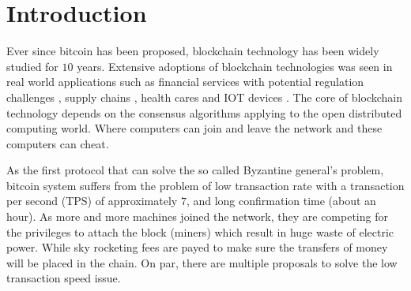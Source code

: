 \section{Introduction}
Ever since bitcoin \cite{nakamoto2008bitcoin} has been proposed, blockchain technology has been widely studied for $10$ years. 
Extensive adoptions of blockchain technologies was seen in real world applications such as 
financial services with potential regulation challenges \cite{michael2018blockchain, tapscott2017blockchain}, 
supply chains \cite{korpela2017digital,tian2016agri, abeyratne2016blockchain}, 
health cares \cite{azaria2016medrec,yue2016healthcare} and IOT devices \cite{christidis2016blockchains}.
The core of blockchain technology depends on the consensus algorithms applying to the open distributed computing world.
Where computers can join and leave the network and these computers can cheat.

As the first protocol that can solve the so called Byzantine general's problem, 
bitcoin system suffers from the problem of low transaction rate with a transaction per second (TPS) of approximately $7$, and long confirmation time (about an hour).
As more and more machines joined the network, they are competing for the privileges to attach the block (miners) which result in huge waste of electric power.
While sky rocketing fees are payed to make sure the transfers of money will be placed in the chain.
On par, there are multiple proposals to solve the low transaction speed issue. 

